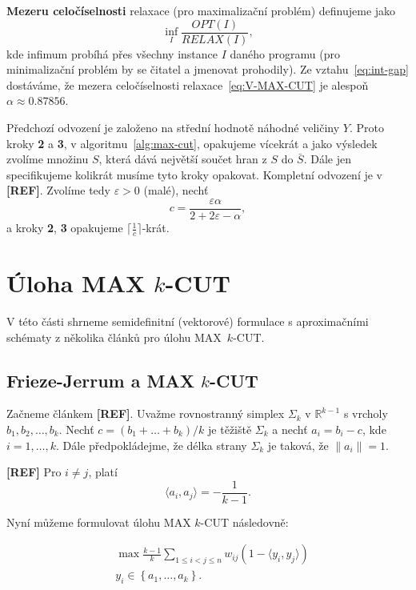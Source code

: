 \noindent \textbf{Mezeru celočíselnosti} relaxace (pro maximalizační problém) definujeme jako
$$
    \inf_{I} \frac{OPT(I)}{RELAX(I)},
$$
kde infimum probíhá přes všechny instance $I$ daného programu (pro minimalizační problém by se čitatel a jmenovat prohodily). Ze vztahu~\ref{eq:int-gap} dostáváme, že mezera celočíselnosti relaxace~\ref{eq:V-MAX-CUT} je alespoň $\alpha \approx 0.87856$.

Předchozí odvození je založeno na střední hodnotě náhodné veličiny $Y$. Proto kroky \textbf{2} a \textbf{3}, v algoritmu~\ref{alg:max-cut}, opakujeme vícekrát a jako výsledek zvolíme množinu $S$, která dává největší součet hran z $S$ do $\bar{S}$. Dále jen specifikujeme kolikrát musíme tyto kroky opakovat. Kompletní odvození je v \textbf{[REF]}. Zvolíme tedy $\varepsilon > 0$ (malé), nechť
$$
    c = \frac{\varepsilon \alpha}{2 + 2\varepsilon - \alpha},
$$
a kroky \textbf{2}, \textbf{3} opakujeme $\lceil \frac{1}{c} \rceil$-krát.


\section{Úloha MAX $k$-CUT}

V této části shrneme semidefinitní (vektorové) formulace s aproximačními schématy z několika článků pro úlohu MAX~$k$-CUT.

\subsection{Frieze-Jerrum a MAX $k$-CUT}

Začneme článkem \textbf{[REF]}. Uvažme rovnostranný simplex $\Sigma_k$ v $\mathbb{R}^{k-1}$ s vrcholy $b_1, b_2, \dots, b_k$. Nechť $c = (b_1 + \dots + b_k) / k$ je těžiště $\Sigma_k$ a nechť $a_i = b_i - c$, kde $i = 1, \dots, k$. Dále předpokládejme, že délka strany $\Sigma_k$ je taková, že $\| a_i\| = 1$.

\begin{lm}\textbf{[REF]}
    Pro $i \neq j$, platí
    $$
        \langle a_i, a_j \rangle = -\frac{1}{k-1}.
    $$
\end{lm}

\noindent Nyní můžeme formulovat úlohu MAX $k$-CUT následovně:

\begin{equation}\tag{FJ}
    \begin{split}
        &\max \frac{k-1}{k} \sum_{1 \leq i < j \leq n} w_{ij} (1 - \langle y_i, y_j \rangle) \\
        &y_i \in \left\{ a_1, \dots, a_k \right\}.
    \end{split}
    \label{eq:FJ}
\end{equation}

